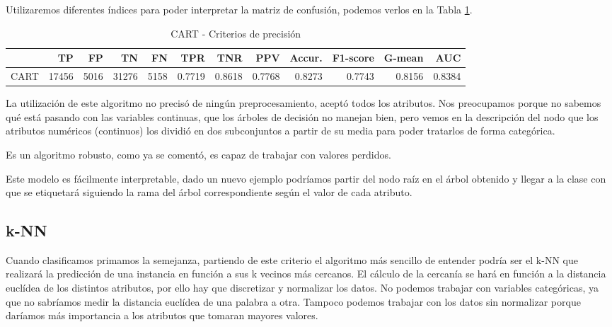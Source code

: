 \documentclass[a4paper, 20pt]{article}
\begin{document}
Utilizaremos diferentes índices para poder interpretar la matriz de confusión, podemos verlos en la Tabla \ref{tab:Tree}. 

\begin{table}[H]
\centering
\caption{CART - Criterios de precisión}
\label{tab:Tree}
\begin{tabular}{lrrrrrrrrrrr}
\toprule
 & TP & FP & TN & FN & TPR & TNR & PPV & Accur. & F1-score & G-mean & AUC\\ \midrule
CART & 17456 & 5016 & 31276 & 5158 & 0.7719 & 0.8618 & 0.7768 & 0.8273 & 0.7743 & 0.8156 & 0.8384\\
\bottomrule
\end{tabular}
\end{table}

La utilización de este algoritmo no precisó de ningún preprocesamiento, aceptó todos los atributos. Nos preocupamos porque no sabemos qué está pasando con las variables continuas, que los árboles de decisión no manejan bien, pero vemos en la descripción del nodo que los atributos numéricos (continuos) los dividió en dos subconjuntos a partir de su media para poder tratarlos de forma categórica.

Es un algoritmo robusto, como ya se comentó, es capaz de trabajar con valores perdidos.

Este modelo es fácilmente interpretable, dado un nuevo ejemplo podríamos partir del nodo raíz en el árbol obtenido y llegar a la clase con que se etiquetará siguiendo la rama del árbol correspondiente según el valor de cada atributo.



\subsection{k-NN}
Cuando clasificamos primamos la semejanza, partiendo de este criterio el algoritmo más sencillo de entender podría ser el k-NN que realizará la predicción de una instancia en función a sus k vecinos más cercanos. El cálculo de la cercanía se hará en función a la distancia euclídea de los distintos atributos, por ello hay que discretizar y normalizar los datos. No podemos trabajar con variables categóricas, ya que no sabríamos medir la distancia euclídea de una palabra a otra. Tampoco podemos trabajar con los datos sin normalizar porque daríamos más importancia a los atributos que tomaran mayores valores.
\end{document}
